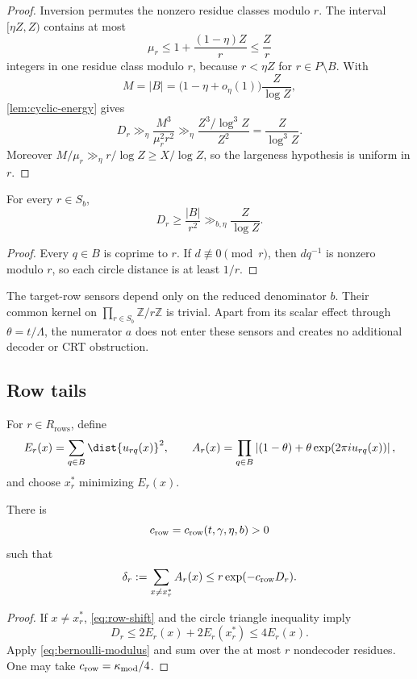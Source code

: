 \begin{proof}
Inversion permutes the nonzero residue classes modulo $r$.  The interval $[\eta Z,Z)$ contains at most
\[
 \mu_r\leq1+\frac{(1-\eta)Z}{r}\leq\frac{Z}{r}
\]
integers in one residue class modulo $r$, because $r<\eta Z$ for $r\in P\setminus B$.  With
\[
 M=|B|=\bigl(1-\eta+o_\eta(1)\bigr)\frac{Z}{\log Z},
\]
\cref{lem:cyclic-energy} gives
\[
 D_r\gg_\eta\frac{M^3}{\mu_r^2r^2}
 \gg_\eta\frac{Z^3/\log^3Z}{Z^2}
 =\frac{Z}{\log^3Z}.
\]
Moreover $M/\mu_r\gg_\eta r/\log Z\geq X/\log Z$, so the largeness hypothesis is uniform in $r$.
\end{proof}

\begin{proposition}
\label{prop:target-row-distance}
For every $r\in S_b$,
\[
 D_r\geq\frac{|B|}{r^2}\gg_{b,\eta}\frac{Z}{\log Z}.
\]
\end{proposition}

\begin{proof}
Every $q\in B$ is coprime to $r$.  If $d\not\equiv0\pmod r$, then $dq^{-1}$ is nonzero modulo $r$, so each circle distance is at least $1/r$.
\end{proof}

The target-row sensors depend only on the reduced denominator $b$.  Their common kernel on $\prod_{r\in S_b}\mathbb Z/r\mathbb Z$ is trivial.  Apart from its scalar effect through $\theta=t/\Lambda$, the numerator $a$ does not enter these sensors and creates no additional decoder or CRT obstruction.

\subsection{Row tails}

For $r\in R_{\mathrm{rows}}$, define
\[
 E_r(x)=\sum_{q\in B}\dist{u_{rq}(x)}^2,
 \qquad
 A_r(x)=\prod_{q\in B}
 \left|(1-\theta)+\theta\exp(2\pi i u_{rq}(x))\right|,
\]
and choose $x_r^*$ minimizing $E_r(x)$.

\begin{lemma}
\label{lem:row-tail}
There is
\[
 c_{\rm row}=c_{\rm row}(t,\gamma,\eta,b)>0
\]
such that
\[
 \delta_r:=\sum_{x\neq x_r^*}A_r(x)
 \leq r\exp(-c_{\rm row}D_r).
\]
\end{lemma}

\begin{proof}
If $x\neq x_r^*$, \cref{eq:row-shift} and the circle triangle inequality imply
\[
 D_r\leq2E_r(x)+2E_r(x_r^*)\leq4E_r(x).
\]
Apply \cref{eq:bernoulli-modulus} and sum over the at most $r$ nondecoder residues.  One may take $c_{\rm row}=\kappa_{\rm mod}/4$.
\end{proof}

